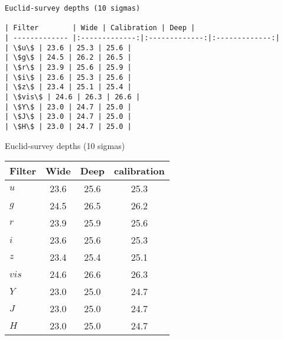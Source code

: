 \documentclass[11pt]{article}
\begin{document}
    \begin{Verbatim}[commandchars=\\\{\}]
Euclid-survey depths (10 sigmas)

| Filter        | Wide | Calibration | Deep |
| ------------- |:-------------:|:-------------:|:-------------:|
| \$u\$ | 23.6 | 25.3 | 25.6 |
| \$g\$ | 24.5 | 26.2 | 26.5 |
| \$r\$ | 23.9 | 25.6 | 25.9 |
| \$i\$ | 23.6 | 25.3 | 25.6 |
| \$z\$ | 23.4 | 25.1 | 25.4 |
| \$vis\$ | 24.6 | 26.3 | 26.6 |
| \$Y\$ | 23.0 | 24.7 | 25.0 |
| \$J\$ | 23.0 | 24.7 | 25.0 |
| \$H\$ | 23.0 | 24.7 | 25.0 |

    \end{Verbatim}

    Euclid-survey depths (10 sigmas)

\begin{longtable}[]{@{}lccc@{}}
\toprule
Filter & Wide & Deep & calibration\tabularnewline
\midrule
\endhead
\(u\) & 23.6 & 25.6 & 25.3\tabularnewline
\(g\) & 24.5 & 26.5 & 26.2\tabularnewline
\(r\) & 23.9 & 25.9 & 25.6\tabularnewline
\(i\) & 23.6 & 25.6 & 25.3\tabularnewline
\(z\) & 23.4 & 25.4 & 25.1\tabularnewline
\(vis\) & 24.6 & 26.6 & 26.3\tabularnewline
\(Y\) & 23.0 & 25.0 & 24.7\tabularnewline
\(J\) & 23.0 & 25.0 & 24.7\tabularnewline
\(H\) & 23.0 & 25.0 & 24.7\tabularnewline
\bottomrule
\end{longtable}
\end{document}
